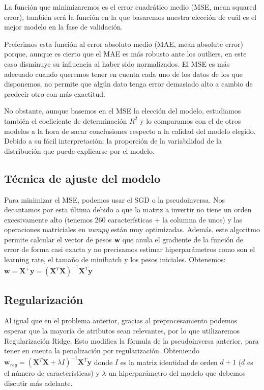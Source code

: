 \documentclass[a4]{article}
\begin{document}
La función que minimizaremos es el error cuadrático medio (MSE, mean
squared error), también será la función en la que basaremos nuestra
elección de cuál es el mejor modelo en la fase de validación.

Preferimos esta función al error absoluto medio (MAE, mean absolute
error) porque, aunque es cierto que el MAE es más robusto ante los
outliers, en este caso disminuye su influencia al haber sido
normalizados. El MSE es más adecuado cuando queremos tener en cuenta
cada uno de los datos de los que disponemos, no permite que algún dato
tenga error demasiado alto a cambio de predecir otro con más exactitud.

No obstante, aunque basemos en el MSE la elección del modelo,
estudiamos también el coeficiente de determinación $R^2$ y lo
comparamos con el de otros modelos a la hora de sacar conclusiones
respecto a la calidad del modelo elegido. Debido a su fácil
interpretación: la proporción de la variabilidad de la distribución
que puede explicarse por el modelo.

\subsection{Técnica de ajuste del modelo}

Para minimizar el MSE, podemos usar el SGD o la pseudoinversa. Nos
decantamos por esta última debido a que la matriz a invertir no tiene
un orden excesivamente alto (tenemos 260 características + la columna
de unos) y las operaciones matriciales en \textit{numpy} están muy
optimizadas. Además, este algoritmo permite calcular el vector de
pesos \textbf{w} que anula el gradiente de la función de error de
forma casi exacta y no precisamos estimar hiperparámetros como son el
learning rate, el tamaño de minibatch y los pesos
iniciales. Obtenemos:
$\textbf{w}=\textbf{X}^+ \textbf{y}=(\textbf{X}^T
\textbf{X})^{-1}\textbf{X}^T \textbf{y}$

\subsection{Regularización}

Al igual que en el problema anterior, gracias al preprocesamiento
podemos esperar que la mayoría de atributos sean relevantes, por lo
que utilizaremos Regularización Ridge. Esto modifica la fórmula de la
pseudoinversa anterior, para tener en cuenta la penalización por
regularización. Obteniendo
$\textbf{w}_{reg}=(\textbf{X}^T \textbf{X}+\lambda I)^{-1}\textbf{X}^T
\textbf{y}$ donde $I$ es la matriz identidad de orden $d+1$ ($d$ es el
número de características) y $\lambda$ un hiperparámetro del modelo
que debemos discutir más adelante.
\end{document}
